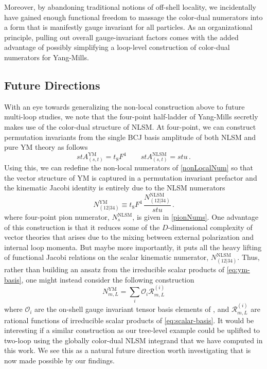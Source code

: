 \documentclass[11pt,letter]{article}
\def\be{\begin{equation}}
\def\ee{\end{equation}}
\begin{document}
Moreover, by abandoning traditional notions of off-shell
locality, we incidentally have gained enough functional freedom to massage the
color-dual numerators into a form that is manifestly gauge invariant
for all particles. As an organizational principle, pulling out overall
gauge-invariant factors comes with the added advantage of possibly simplifying
a loop-level construction of color-dual numerators for Yang-Mills.

\subsection{Future Directions}\label{sec:Discussion}
With an eye towards generalizing the non-local construction above to future multi-loop studies, we note that the four-point half-ladder of Yang-Mills secretly makes use of the color-dual structure of NLSM. At four-point, we can construct permutation invariants from the single BCJ basis amplitude of both NLSM and pure YM theory as follows
\be
s t A^{\text{YM}}_{(s,t)} = t_8F^4 \qquad s t A^{\text{NLSM}}_{(s,t)} = s t u\, .
\ee
Using this, we can redefine the non-local numerators of \cref{nonLocalNum} so that the vector structure of YM is captured in a permutation invariant prefactor and the kinematic Jacobi identity is entirely due to the NLSM numerators
\be
N_{(12|34)}^{\text{YM}} \equiv t_8F^4 \,\frac{N_{(12|34)}^{\text{NLSM}}}{s t u } \, .
\ee
where four-point pion numerator, $N_s^{\text{NLSM}}$, is given in \cref{pionNums}. One advantage of this construction is that it reduces some of the $D$-dimensional complexity of vector theories that arises due to the mixing between external polarization and
internal loop momenta. But maybe more importantly, it puts all the heavy lifting of functional Jacobi relations on the scalar kinematic numerator, $N_{(12|34)}^{\text{NLSM}}$. Thus, rather
than building an ansatz from the irreducible scalar products of
\cref{eq:ym-basis}, one might instead consider the following construction
\begin{equation}
N^{\text{YM}}_{m,L} = \sum_i \mathcal{O}_i \mathcal{R}^{(i)}_{m,L}
\end{equation}
where $\mathcal{O}_i$ are the on-shell gauge invariant tensor basis elements of
\cite{Bern:2017tuc,Carrasco:2019yyn}, and $ \mathcal{R}^{(i)}_{m,L}$ are
rational functions of irreducible scalar products of \cref{eq:scalar-basis}. It would be interesting if a similar construction as our tree-level example could be uplifted to two-loop using the globally color-dual NLSM integrand that we have computed in this work. We see this as a natural future direction worth investigating that is now made possible by our findings.
\end{document}
